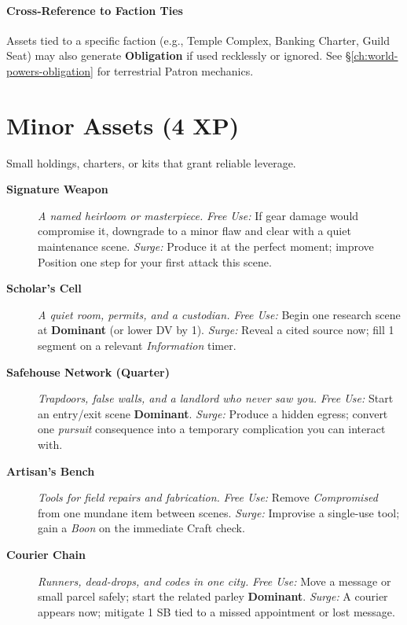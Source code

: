 \paragraph{Cross‑Reference to Faction Ties}
Assets tied to a specific faction (e.g., Temple Complex, Banking Charter, Guild Seat) may also generate \textbf{Obligation} if used recklessly or ignored. See \S\ref{ch:world-powers-obligation} for terrestrial Patron mechanics.

\section{Minor Assets (4 XP)}
Small holdings, charters, or kits that grant reliable leverage.
\begin{description}
  \item[\textbf{Signature Weapon}]  \emph{A named heirloom or masterpiece.} \emph{Free Use:} If gear damage would compromise it, downgrade to a minor flaw and clear with a quiet maintenance scene. \emph{Surge:} Produce it at the perfect moment; improve Position one step for your first attack this scene.

  \item[\textbf{Scholar's Cell}]  \emph{A quiet room, permits, and a custodian.} \emph{Free Use:} Begin one research scene at \textbf{Dominant} (or lower DV by 1). \emph{Surge:} Reveal a cited source now; fill 1 segment on a relevant \emph{Information} timer.

  \item[\textbf{Safehouse Network (Quarter)}]  \emph{Trapdoors, false walls, and a landlord who never saw you.} \emph{Free Use:} Start an entry/exit scene \textbf{Dominant}. \emph{Surge:} Produce a hidden egress; convert one \emph{pursuit} consequence into a temporary complication you can interact with.

  \item[\textbf{Artisan's Bench}]  \emph{Tools for field repairs and fabrication.} \emph{Free Use:} Remove \emph{Compromised} from one mundane item between scenes. \emph{Surge:} Improvise a single-use tool; gain a \emph{Boon} on the immediate Craft check.

  \item[\textbf{Courier Chain}]  \emph{Runners, dead-drops, and codes in one city.} \emph{Free Use:} Move a message or small parcel safely; start the related parley \textbf{Dominant}. \emph{Surge:} A courier appears now; mitigate 1 SB tied to a missed appointment or lost message.


\end{description}
